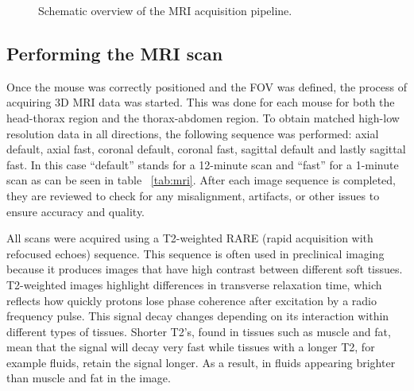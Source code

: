 \documentclass[twocolumn]{article}
\begin{document}
\begin{figure}[h!]
\centering
{}
\caption{Schematic overview of the MRI acquisition pipeline.}
\label{fig:acquisition_pipeline}
\end{figure}


\subsection{Performing the MRI scan}
Once the mouse was correctly positioned and the FOV was defined, the process of acquiring 3D MRI data was started. 
This was done for each mouse for both the head-thorax region and the thorax-abdomen region. 
To obtain matched high-low resolution data in all directions, the following sequence was performed: axial default, axial fast, coronal default, coronal fast, sagittal default and lastly sagittal fast. 
In this case ``default'' stands for a 12-minute scan and ``fast'' for a 1-minute scan as can be seen in table ~\ref{tab:mri}.
After each image sequence is completed, they are reviewed to check for any misalignment, artifacts, or other issues to ensure accuracy and quality. 

All scans were acquired using a T2-weighted RARE (rapid acquisition with refocused echoes) sequence. 
This sequence is often used in preclinical imaging because it produces images that have high contrast between different soft tissues. 
T2-weighted images highlight  differences in transverse relaxation time, which reflects how quickly protons lose phase coherence after excitation by a radio frequency pulse. 
This signal decay changes depending on its interaction within different types of tissues. 
Shorter T2's, found in tissues such as muscle and fat, mean that the signal will decay very fast while tissues with a longer T2, for example fluids, retain the signal longer. 
As a result, in fluids appearing brighter than muscle and fat in the image. 
\end{document}
